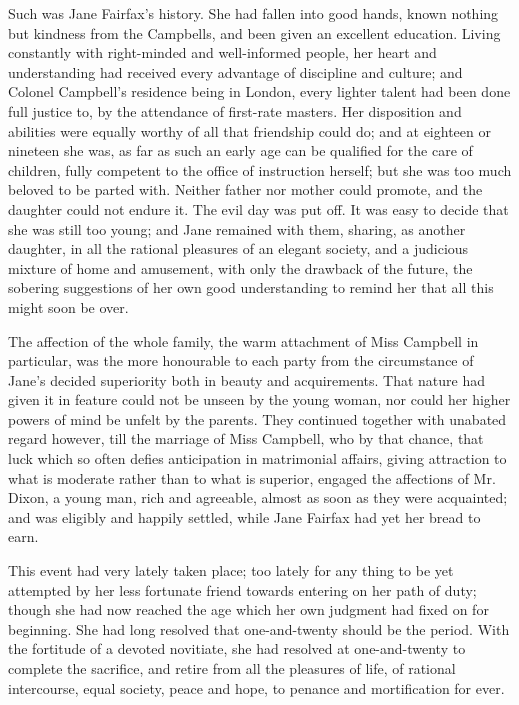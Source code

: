Such was Jane Fairfax's history. She had fallen into good hands, known nothing but kindness from the Campbells, and been given an excellent education. Living constantly with right-minded and well-informed people, her heart and understanding had received every advantage of discipline and culture; and Colonel Campbell's residence being in London, every lighter talent had been done full justice to, by the attendance of first-rate masters. Her disposition and abilities were equally worthy of all that friendship could do; and at eighteen or nineteen she was, as far as such an early age can be qualified for the care of children, fully competent to the office of instruction herself; but she was too much beloved to be parted with. Neither father nor mother could promote, and the daughter could not endure it. The evil day was put off. It was easy to decide that she was still too young; and Jane remained with them, sharing, as another daughter, in all the rational pleasures of an elegant society, and a judicious mixture of home and amusement, with only the drawback of the future, the sobering suggestions of her own good understanding to remind her that all this might soon be over.

The affection of the whole family, the warm attachment of Miss Campbell in particular, was the more honourable to each party from the circumstance of Jane's decided superiority both in beauty and acquirements. That nature had given it in feature could not be unseen by the young woman, nor could her higher powers of mind be unfelt by the parents. They continued together with unabated regard however, till the marriage of Miss Campbell, who by that chance, that luck which so often defies anticipation in matrimonial affairs, giving attraction to what is moderate rather than to what is superior, engaged the affections of Mr. Dixon, a young man, rich and agreeable, almost as soon as they were acquainted; and was eligibly and happily settled, while Jane Fairfax had yet her bread to earn.

This event had very lately taken place; too lately for any thing to be yet attempted by her less fortunate friend towards entering on her path of duty; though she had now reached the age which her own judgment had fixed on for beginning. She had long resolved that one-and-twenty should be the period. With the fortitude of a devoted novitiate, she had resolved at one-and-twenty to complete the sacrifice, and retire from all the pleasures of life, of rational intercourse, equal society, peace and hope, to penance and mortification for ever.

